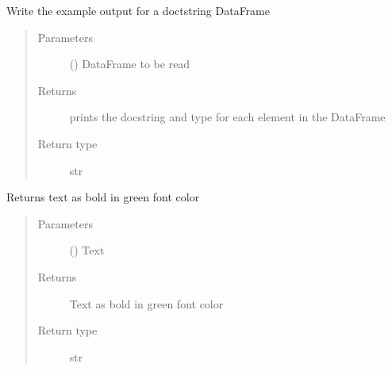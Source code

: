 \documentclass[letterpaper,10pt,english]{sphinxmanual}
\begin{document}

\begin{fulllineitems}
\label{\detokenize{openfdem:openfdem.formatting_codes.docstring_creator}}
Write the example output for a doctstring DataFrame
\begin{quote}\begin{description}
\item[{Parameters}] \leavevmode
{} () \textendash{} DataFrame to be read

\item[{Returns}] \leavevmode
prints the docstring and type for each element in the DataFrame

\item[{Return type}] \leavevmode
str

\end{description}\end{quote}

\end{fulllineitems}


\begin{fulllineitems}
\label{\detokenize{openfdem:openfdem.formatting_codes.green_text}}
Returns text as bold in green font color
\begin{quote}\begin{description}
\item[{Parameters}] \leavevmode
{} () \textendash{} Text

\item[{Returns}] \leavevmode
Text as bold in green font color

\item[{Return type}] \leavevmode
str

\end{description}\end{quote}

\end{fulllineitems}
\end{document}
